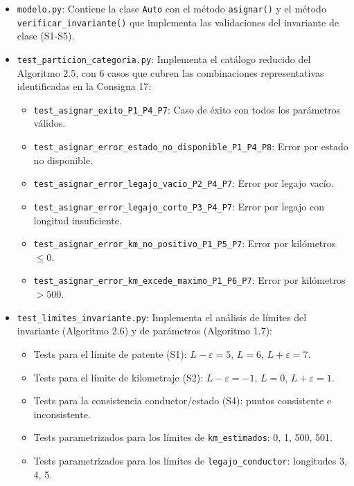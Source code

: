 \begin{itemize}
    \item \texttt{modelo.py}: Contiene la clase \texttt{Auto} con el método \texttt{asignar()} y el método \texttt{verificar\_invariante()} que implementa las validaciones del invariante de clase (S1-S5).
    
    \item \texttt{test\_particion\_categoria.py}: Implementa el catálogo reducido del Algoritmo 2.5, con 6 casos que cubren las combinaciones representativas identificadas en la Consigna 17:
    \begin{itemize}
        \item \texttt{test\_asignar\_exito\_P1\_P4\_P7}: Caso de éxito con todos los parámetros válidos.
        \item \texttt{test\_asignar\_error\_estado\_no\_disponible\_P1\_P4\_P8}: Error por estado no disponible.
        \item \texttt{test\_asignar\_error\_legajo\_vacio\_P2\_P4\_P7}: Error por legajo vacío.
        \item \texttt{test\_asignar\_error\_legajo\_corto\_P3\_P4\_P7}: Error por legajo con longitud insuficiente.
        \item \texttt{test\_asignar\_error\_km\_no\_positivo\_P1\_P5\_P7}: Error por kilómetros $\leq 0$.
        \item \texttt{test\_asignar\_error\_km\_excede\_maximo\_P1\_P6\_P7}: Error por kilómetros $> 500$.
    \end{itemize}
    
    \item \texttt{test\_limites\_invariante.py}: Implementa el análisis de límites del invariante (Algoritmo 2.6) y de parámetros (Algoritmo 1.7):
    \begin{itemize}
        \item Tests para el límite de patente (S1): $L-\varepsilon=5$, $L=6$, $L+\varepsilon=7$.
        \item Tests para el límite de kilometraje (S2): $L-\varepsilon=-1$, $L=0$, $L+\varepsilon=1$.
        \item Tests para la consistencia conductor/estado (S4): puntos consistente e inconsistente.
        \item Tests parametrizados para los límites de \texttt{km\_estimados}: 0, 1, 500, 501.
        \item Tests parametrizados para los límites de \texttt{legajo\_conductor}: longitudes 3, 4, 5.
    \end{itemize}
\end{itemize}

